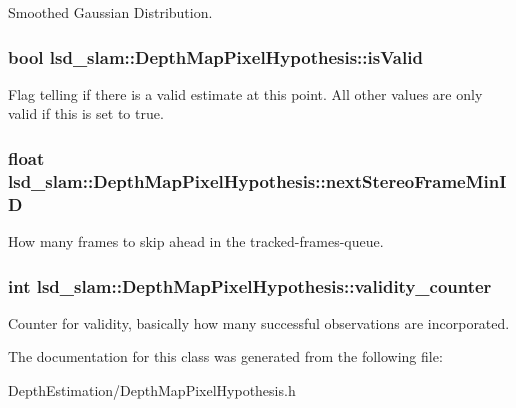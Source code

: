 Smoothed Gaussian Distribution. \hypertarget{classlsd__slam_1_1_depth_map_pixel_hypothesis_aba28a1bf8203d9e0e323b9015d4ac425}{
\subsubsection[{is\-Valid}]{\setlength{\rightskip}{0pt plus 5cm}bool lsd\-\_\-slam\-::\-Depth\-Map\-Pixel\-Hypothesis\-::is\-Valid}}\label{classlsd__slam_1_1_depth_map_pixel_hypothesis_aba28a1bf8203d9e0e323b9015d4ac425}
Flag telling if there is a valid estimate at this point. All other values are only valid if this is set to true. \hypertarget{classlsd__slam_1_1_depth_map_pixel_hypothesis_a6de9a990e0a4cbbd2ce810503996f76c}{
\subsubsection[{next\-Stereo\-Frame\-Min\-I\-D}]{\setlength{\rightskip}{0pt plus 5cm}float lsd\-\_\-slam\-::\-Depth\-Map\-Pixel\-Hypothesis\-::next\-Stereo\-Frame\-Min\-I\-D}}\label{classlsd__slam_1_1_depth_map_pixel_hypothesis_a6de9a990e0a4cbbd2ce810503996f76c}
How many frames to skip ahead in the tracked-\/frames-\/queue. \hypertarget{classlsd__slam_1_1_depth_map_pixel_hypothesis_a56802b2f4413dd295383d142a3499808}{
\subsubsection[{validity\-\_\-counter}]{\setlength{\rightskip}{0pt plus 5cm}int lsd\-\_\-slam\-::\-Depth\-Map\-Pixel\-Hypothesis\-::validity\-\_\-counter}}\label{classlsd__slam_1_1_depth_map_pixel_hypothesis_a56802b2f4413dd295383d142a3499808}
Counter for validity, basically how many successful observations are incorporated. 

The documentation for this class was generated from the following file\-:\begin{DoxyCompactItemize}
\item 
Depth\-Estimation/Depth\-Map\-Pixel\-Hypothesis.\-h\end{DoxyCompactItemize}
